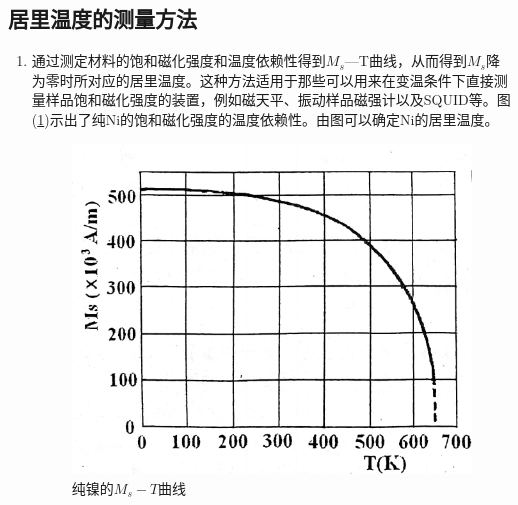 \documentclass[a4paper]{article}
\begin{document}
\subsection{居里温度的测量方法}
\begin{enumerate}
    \item 通过测定材料的饱和磁化强度和温度依赖性得到$M_s$—T曲线，从而得到$M_s$降为零时所对应的居里温度。这种方法适用于那些可以用来在变温条件下直接测量样品饱和磁化强度的装置，例如磁天平、振动样品磁强计以及SQUID等。图(\ref{fig1})示出了纯Ni的饱和磁化强度的温度依赖性。由图可以确定Ni的居里温度。
          \begin{figure}[!h]
              \centering
              \begin{minipage}[!h]{0.48\textwidth}
                  \begin{center}
                      \includegraphics[width=1\textwidth]{fig/fig1.pdf}
                      \caption{纯镍的$M_s - T$曲线}\label{fig1}
                  \end{center}
              \end{minipage}
              \begin{minipage}[!h]{0.48\textwidth}
                  \begin{center}

\end{center}
\end{minipage}
\end{figure}
\end{enumerate}
\end{document}
